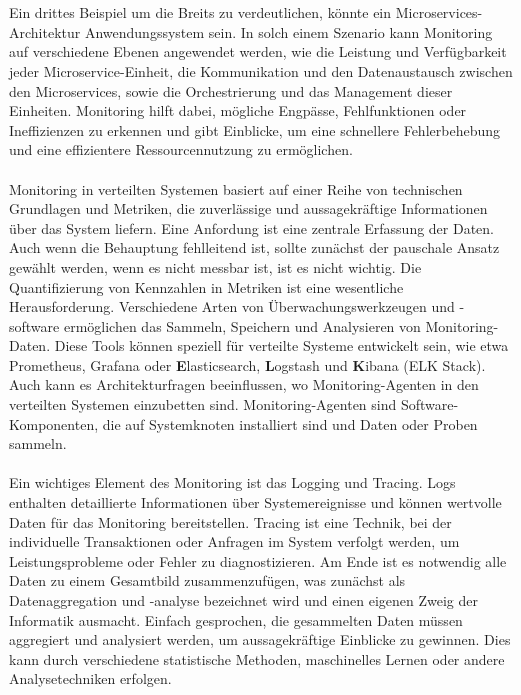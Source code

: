 \documentclass[../vs-script-first-v01.tex]{subfiles}
\begin{document}
\\\\
Ein drittes Beispiel um die Breits zu verdeutlichen, könnte ein Microservices-Architektur Anwendungssystem sein. In solch einem Szenario kann Monitoring auf verschiedene Ebenen angewendet werden, wie die Leistung und Verfügbarkeit jeder Microservice-Einheit, die Kommunikation und den Datenaustausch zwischen den Microservices, sowie die Orchestrierung und das Management dieser Einheiten. Monitoring hilft dabei, mögliche Engpässe, Fehlfunktionen oder Ineffizienzen zu erkennen und gibt Einblicke, um eine schnellere Fehlerbehebung und eine effizientere Ressourcennutzung zu ermöglichen.
\\\\
Monitoring in verteilten Systemen basiert auf einer Reihe von technischen Grundlagen und Metriken, die zuverlässige und aussagekräftige Informationen über das System liefern. Eine Anfordung ist eine zentrale Erfassung der Daten. Auch wenn die Behauptung fehlleitend ist, sollte zunächst der pauschale Ansatz gewählt werden, wenn es nicht messbar ist, ist es nicht wichtig. Die Quantifizierung von Kennzahlen in Metriken ist eine wesentliche Herausforderung. Verschiedene Arten von Überwachungswerkzeugen und -software ermöglichen das Sammeln, Speichern und Analysieren von Monitoring-Daten. Diese Tools können speziell für verteilte Systeme entwickelt sein, wie etwa Prometheus, Grafana oder \textbf{E}lasticsearch, \textbf{L}ogstash und \textbf{K}ibana (ELK Stack).
Auch kann es Architekturfragen beeinflussen, wo Monitoring-Agenten in den verteilten Systemen einzubetten sind. Monitoring-Agenten sind Software-Komponenten, die auf Systemknoten installiert sind und Daten  oder Proben sammeln. 
\\\\
Ein wichtiges Element des Monitoring ist das Logging und Tracing. Logs enthalten detaillierte Informationen über Systemereignisse und können wertvolle Daten für das Monitoring bereitstellen. Tracing ist eine Technik, bei der individuelle Transaktionen oder Anfragen im System verfolgt werden, um Leistungsprobleme oder Fehler zu diagnostizieren.
Am Ende ist es notwendig alle Daten zu einem Gesamtbild zusammenzufügen, was zunächst als Datenaggregation und -analyse bezeichnet wird und einen eigenen Zweig der Informatik ausmacht. Einfach gesprochen, die gesammelten Daten müssen aggregiert und analysiert werden, um aussagekräftige Einblicke zu gewinnen. Dies kann durch verschiedene statistische Methoden, maschinelles Lernen oder andere Analysetechniken erfolgen.
\end{document}
